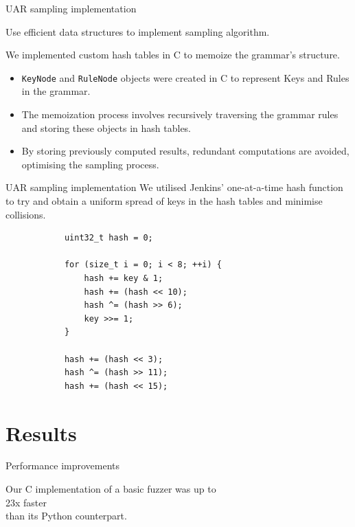 \documentclass{beamer}
\begin{document}
	\begin{frame}{UAR sampling implementation}
		\begin{block}{}
			Use efficient data structures to implement sampling algorithm.
		\end{block}
		We implemented custom hash tables in C to memoize the grammar's structure.
		\begin{itemize}
			\item \texttt{KeyNode} and \texttt{RuleNode} objects were created in C to represent Keys and Rules in the grammar.
			\item The memoization process involves recursively traversing the grammar rules and storing these objects in hash tables.
			\item By storing previously computed results, redundant computations are avoided, optimising the sampling process.
		\end{itemize}
	\end{frame}

\begin{frame}[fragile]{UAR sampling implementation}
	We utilised \alert{Jenkins' one-at-a-time} hash function to try and obtain a uniform spread of keys in the hash tables and minimise collisions.
	\begin{small}
		\begin{verbatim}
			uint32_t hash = 0;

			for (size_t i = 0; i < 8; ++i) {
			    hash += key & 1;
			    hash += (hash << 10);
			    hash ^= (hash >> 6);
			    key >>= 1;
			}

			hash += (hash << 3);
			hash ^= (hash >> 11);
			hash += (hash << 15);
		\end{verbatim}
	\end{small}
\end{frame}

	\section{Results}

	\begin{frame}{Performance improvements}

		\begin{center}
			Our C implementation of a basic fuzzer was up to\\
			\vspace{10pt} %
			{\Huge %
			23x faster} \\ %
			\vspace{10pt} %
			than its Python counterpart.
		\end{center}
		
	\end{frame}
\end{document}
